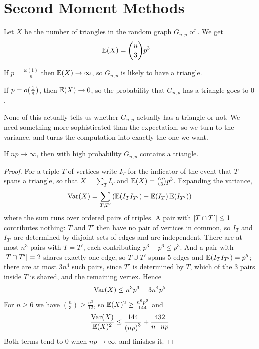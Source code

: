 \section{Second Moment Methods}

Let $X$ be the number of triangles in the random graph $G_{n, p}$ of . We get
\begin{align*}
    \mathbb{E}(X) &= \binom{n}{3} p^3
\end{align*}

If $p = \frac{\omega(1)}{n}$ then $\mathbb{E}(X) \to \infty$, so $G_{n, p}$ is likely to have a triangle.

If $p = o\!\left( \frac{1}{n} \right)$, then $\mathbb{E}(X) \to 0$, so the probability that $G_{n, p}$ has a triangle goes to $0$.

None of this actually tells us whether $G_{n, p}$ actually has a triangle or not. We need something more sophisticated than the expectation, so we turn to the variance, and  turns the computation into exactly the one we want.

\begin{boxtheorem} \label{Ch4:Thm:Triangle_Threshold}
    If $np \to \infty$, then with high probability $G_{n, p}$ contains a triangle.
\end{boxtheorem}
\begin{proof}
    For a triple $T$ of vertices write $I_T$ for the indicator of the event that $T$ spans a triangle, so that $X = \sum_T I_T$ and $\mathbb{E}(X) = \binom{n}{3} p^3$. Expanding the variance,
    \begin{align*}
        \operatorname{Var}\!\left( X \right) = \sum_{T, T'} \left( \mathbb{E}\!\left( I_T I_{T'} \right) - \mathbb{E}\!\left( I_T \right) \mathbb{E}\!\left( I_{T'} \right) \right)
    \end{align*}
    where the sum runs over ordered pairs of triples. A pair with $\left\lvert T \cap T' \right\rvert \leq 1$ contributes nothing: $T$ and $T'$ then have no pair of vertices in common, so $I_T$ and $I_{T'}$ are determined by disjoint sets of edges and are independent. There are at most $n^3$ pairs with $T = T'$, each contributing $p^3 - p^6 \leq p^3$. And a pair with $\left\lvert T \cap T' \right\rvert = 2$ shares exactly one edge, so $T \cup T'$ spans $5$ edges and $\mathbb{E}\!\left( I_T I_{T'} \right) = p^5$; there are at most $3n^4$ such pairs, since $T'$ is determined by $T$, which of the $3$ pairs inside $T$ is shared, and the remaining vertex. Hence
    \begin{align*}
        \operatorname{Var}\!\left( X \right) \leq n^3 p^3 + 3 n^4 p^5
    \end{align*}
    For $n \geq 6$ we have $\binom{n}{3} \geq \frac{n^3}{12}$, so $\mathbb{E}(X)^2 \geq \frac{n^6 p^6}{144}$ and
    \begin{align*}
        \frac{\operatorname{Var}\!\left( X \right)}{\mathbb{E}(X)^2} \leq \frac{144}{\left( np \right)^3} + \frac{432}{n \cdot np}
    \end{align*}
    Both terms tend to $0$ when $np \to \infty$, and  finishes it.
\end{proof}

